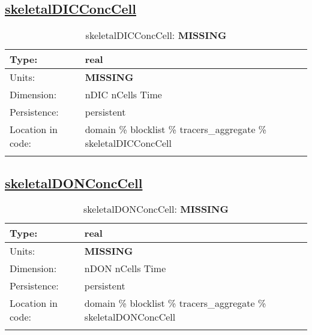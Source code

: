 \subsection[skeletalDICConcCell]{\hyperref[sec:var_tab_tracers_aggregate]{skeletalDICConcCell}}
\label{subsec:var_sec_tracers_aggregate_skeletalDICConcCell}
\begin{center}
\begin{longtable}{| p{2.0in} | p{4.0in} |}
        \hline 
        Type: & real \\
        \hline 
        Units: & {\bf \color{red} MISSING} \\
        \hline 
        Dimension: & nDIC nCells Time \\
        \hline 
        Persistence: & persistent \\
        \hline 
         Location in code: & domain \% blocklist \% tracers\_aggregate \% skeletalDICConcCell \\
         \hline 
    \caption{skeletalDICConcCell: {\bf \color{red} MISSING}}
\end{longtable}
\end{center}
\subsection[skeletalDONConcCell]{\hyperref[sec:var_tab_tracers_aggregate]{skeletalDONConcCell}}
\label{subsec:var_sec_tracers_aggregate_skeletalDONConcCell}
\begin{center}
\begin{longtable}{| p{2.0in} | p{4.0in} |}
        \hline 
        Type: & real \\
        \hline 
        Units: & {\bf \color{red} MISSING} \\
        \hline 
        Dimension: & nDON nCells Time \\
        \hline 
        Persistence: & persistent \\
        \hline 
         Location in code: & domain \% blocklist \% tracers\_aggregate \% skeletalDONConcCell \\
         \hline 
    \caption{skeletalDONConcCell: {\bf \color{red} MISSING}}
\end{longtable}
\end{center}
